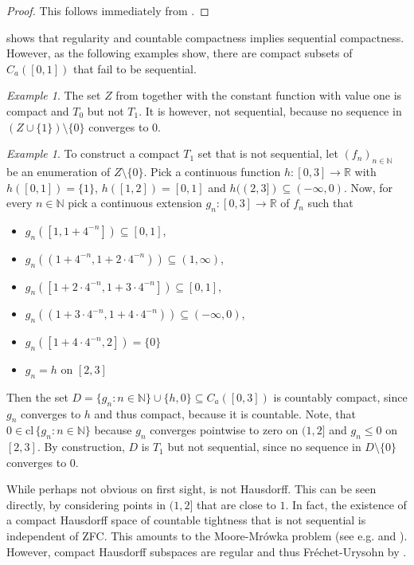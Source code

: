 \documentclass[
	paper=A4,
	pagesize=auto,
	fontsize=12pt
]{scrartcl}
\theoremstyle{plain}
\theoremstyle{remark}
\newtheorem{example}[theorem]{Example}
\theoremstyle{definition}
\begin{document}
\begin{proof}
This follows immediately from .
\end{proof}
%
 shows that regularity and countable compactness implies sequential compactness.
However, as the following examples show, there are compact subsets of $C_a([0,1])$ that fail to be sequential.
%
\begin{example}
The set $Z$ from  together with the constant function with value one is compact and $T_0$ but not $T_1$.
It is however, not sequential, because no sequence in $(Z \cup \{ 1 \}) \setminus \{ 0 \}$ converges to $0$.
\end{example}
\begin{example}
\label{ex:CompactT1NonSequential}
To construct a compact $T_1$ set that is not sequential, let $(f_n)_{n \in \mathbb{N}}$ be an enumeration of $Z \setminus \{ 0 \}$.
Pick a continuous function $h : [0, 3] \to \mathbb{R}$ with $h([0,1]) = \{ 1 \}$, $h([1, 2]) = [0, 1]$ and $h((2, 3]) \subseteq (-\infty, 0)$.
Now, for every $n \in \mathbb{N}$ pick a continuous extension $g_n : [0, 3] \to \mathbb{R}$ of $f_n$ such that
%
\begin{itemize}
\item $g_n([1, 1 + 4^{-n}]) \subseteq [0, 1]$,
\item $g_n((1 + 4^{-n}, 1 + 2 \cdot 4^{-n})) \subseteq (1, \infty)$,
\item $g_n([1 + 2 \cdot 4^{-n}, 1 + 3 \cdot 4^{-n}]) \subseteq [0, 1]$,
\item $g_n((1 + 3 \cdot 4^{-n}, 1 + 4 \cdot 4^{-n})) \subseteq (-\infty, 0)$,
\item $g_n([1 + 4 \cdot 4^{-n}, 2]) = \{ 0 \}$
\item $g_n = h$ on $[2, 3]$
\end{itemize}
%
Then the set $D = \{ g_n : n \in \mathbb{N} \} \cup \{ h, 0 \} \subseteq C_a([0, 3])$ is countably compact, since $g_n$ converges to $h$ and thus compact, because it is countable.
Note, that $0 \in \mathrm{cl}\, \{ g_n : n \in \mathbb{N} \}$ because $g_n$ converges pointwise to zero on $(1, 2]$ and $g_n \le 0$ on $[2, 3]$.
By construction, $D$ is $T_1$ but not sequential, since no sequence in $D \setminus \{ 0 \}$ converges to $0$.
\end{example}
%
While perhaps not obvious on first sight,  is not Hausdorff.
This can be seen directly, by considering points in $(1, 2]$ that are close to $1$.
In fact, the existence of a compact Hausdorff space of countable tightness that is not sequential is independent of ZFC.
This amounts to the Moore-Mrówka problem (see e.g. \cite{src:Balogh:CompactHausdorffCountableTightness} and \cite[Classic Problem VI]{src:TopologyProceedings2:Problems}).
However, compact Hausdorff subspaces are regular and thus Fréchet-Urysohn by .
\end{document}
